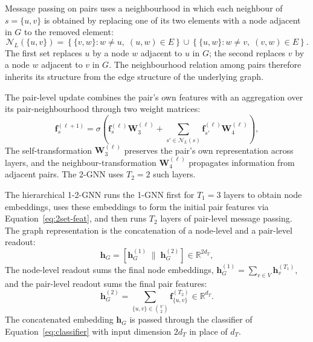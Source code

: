 \documentclass[12pt,a4paper]{article}
\begin{document}
Message passing on pairs uses a neighbourhood in which each neighbour of $s = \{u,v\}$ is obtained by replacing one of its two elements with a node adjacent in $G$ to the removed element:
\begin{equation}
  \mathcal{N}_L(\{u, v\}) = \left\{\{v, w\} : w \neq u,\; (u, w) \in E\right\} \cup \left\{\{u, w\} : w \neq v,\; (v, w) \in E\right\}.
  \label{eq:2set-nbr}
\end{equation}
The first set replaces $u$ by a node $w$ adjacent to $u$ in $G$; the second replaces $v$ by a node $w$ adjacent to $v$ in $G$. The neighbourhood relation among pairs therefore inherits its structure from the edge structure of the underlying graph.

The pair-level update combines the pair's own features with an aggregation over its pair-neighbourhood through two weight matrices:
\begin{equation}
  \mathbf{f}_s^{(\ell+1)} = \sigma\!\left(\mathbf{f}_s^{(\ell)} \mathbf{W}_3^{(\ell)} + \sum_{s' \in \mathcal{N}_L(s)} \mathbf{f}_{s'}^{(\ell)} \mathbf{W}_4^{(\ell)}\right),
  \label{eq:2gnn-update}
\end{equation}
The self-transformation $\mathbf{W}_3^{(\ell)}$ preserves the pair's own representation across layers, and the neighbour-transformation $\mathbf{W}_4^{(\ell)}$ propagates information from adjacent pairs. The 2-GNN uses $T_2 = 2$ such layers.

The hierarchical 1-2-GNN runs the 1-GNN first for $T_1 = 3$ layers to obtain node embeddings, uses these embeddings to form the initial pair features via Equation~\eqref{eq:2set-feat}, and then runs $T_2$ layers of pair-level message passing. The graph representation is the concatenation of a node-level and a pair-level readout:
\begin{equation}
  \mathbf{h}_G = \left[\mathbf{h}_G^{(1)} \;\|\; \mathbf{h}_G^{(2)}\right] \in \mathbb{R}^{2d_T},
  \label{eq:12gnn-readout}
\end{equation}
The node-level readout sums the final node embeddings, $\mathbf{h}_G^{(1)} = \sum_{v \in V} \mathbf{h}_v^{(T_1)}$, and the pair-level readout sums the final pair features:
\begin{equation}
  \mathbf{h}_G^{(2)} = \sum_{\{u,v\} \in \binom{V}{2}} \mathbf{f}_{\{u,v\}}^{(T_2)} \in \mathbb{R}^{d_T}.
  \label{eq:2gnn-readout}
\end{equation}
The concatenated embedding $\mathbf{h}_G$ is passed through the classifier of Equation~\eqref{eq:classifier} with input dimension $2d_T$ in place of $d_T$.
\end{document}
